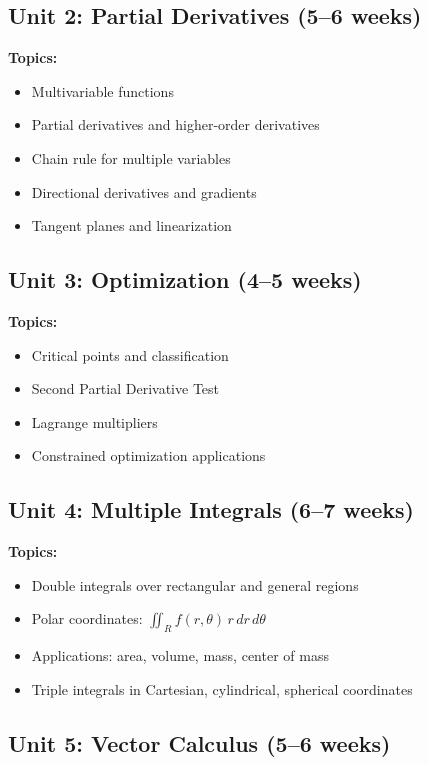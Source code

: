 \documentclass[12pt,oneside]{book}
\begin{document}
\subsection{Unit 2: Partial Derivatives (5--6 weeks)}

\textbf{Topics:}
\begin{itemize}
    \item Multivariable functions
    \item Partial derivatives and higher-order derivatives
    \item Chain rule for multiple variables
    \item Directional derivatives and gradients
    \item Tangent planes and linearization
\end{itemize}

\subsection{Unit 3: Optimization (4--5 weeks)}

\textbf{Topics:}
\begin{itemize}
    \item Critical points and classification
    \item Second Partial Derivative Test
    \item Lagrange multipliers
    \item Constrained optimization applications
\end{itemize}

\subsection{Unit 4: Multiple Integrals (6--7 weeks)}

\textbf{Topics:}
\begin{itemize}
    \item Double integrals over rectangular and general regions
    \item Polar coordinates: $\iint_R f(r,\theta) \, r \, dr \, d\theta$
    \item Applications: area, volume, mass, center of mass
    \item Triple integrals in Cartesian, cylindrical, spherical coordinates
\end{itemize}

\subsection{Unit 5: Vector Calculus (5--6 weeks)}
\end{document}
